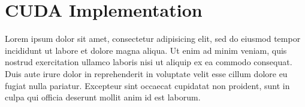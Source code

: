 \documentclass[a4paper,10pt,openright,openbib,twocolumn]{article}
\begin{document}
\appendix
\appendixpage
\section{CUDA Implementation}
Lorem ipsum dolor sit amet, consectetur adipisicing elit, sed do eiusmod
tempor incididunt ut labore et dolore magna aliqua. Ut enim ad minim veniam,
quis nostrud exercitation ullamco laboris nisi ut aliquip ex ea commodo
consequat. Duis aute irure dolor in reprehenderit in voluptate velit esse
cillum dolore eu fugiat nulla pariatur. Excepteur sint occaecat cupidatat non
proident, sunt in culpa qui officia deserunt mollit anim id est laborum.
\end{document}
